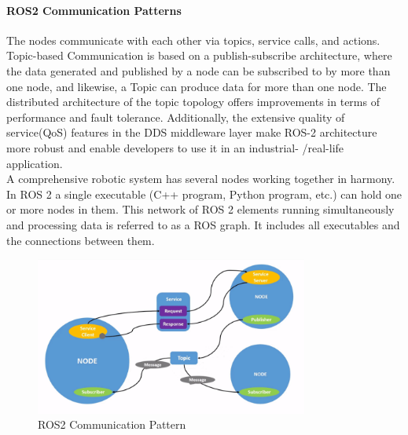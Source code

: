 	\paragraph[ROS2]{ROS2 Communication Patterns}
	\label{Grundlagen:ROS2:CommunicationPatterns}

	The nodes communicate with each other via topics, service calls, and actions. Topic-based Communication is based on a publish-subscribe architecture, where the data generated and published by a node can be subscribed to by more than one node, and likewise, a Topic can produce data for more than one node. 
	The distributed architecture of the topic topology offers improvements in terms of performance and fault tolerance. Additionally, the extensive quality of service(QoS) features in the DDS middleware layer make ROS-2 architecture more robust and enable developers to use it in an industrial- /real-life application.\\

	A comprehensive robotic system has several nodes working together in harmony. In ROS 2 a single executable (C++ program, Python program, etc.) can hold one or more nodes in them. This network of ROS 2 elements running simultaneously and processing data is referred to as a ROS graph. It includes all executables and the connections between them.



	\begin{figure}[H]
		\centering
		\includegraphics[width=0.8\textwidth]{"Bilder/ros-nodes.png"}
		\caption{ROS2 Communication Pattern \cite{ros2Basic}}
		\label{fig:Background:Ros2Nodes}					
	\end{figure}

